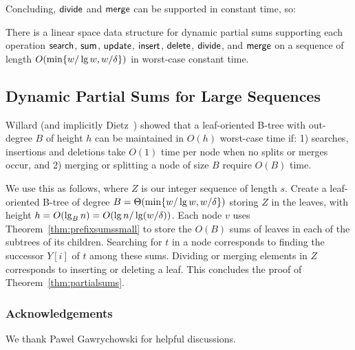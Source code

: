 


%

Concluding, $\mathsf{divide}$ and $\mathsf{merge}$ can be supported in constant time, so:

\begin{theorem}\label{thm:prefixsumssmall}
    There is a linear space data structure for dynamic partial sums supporting each operation $\mathsf{search}$, $\mathsf{sum}$, $\mathsf{update}$, $\mathsf{insert}$, $\mathsf{delete}$, $\mathsf{divide}$, and $\mathsf{merge}$ on a sequence of length $O(\min \{w / \lg w, w / \delta \})$ in worst-case constant time.
\end{theorem}

\subsection{Dynamic Partial Sums for Large Sequences}
Willard \cite{willard2000examining} (and implicitly Dietz~\cite{dietz1989optimal}) showed that a leaf-oriented B-tree with out-degree $B$ of height $h$ can be maintained in $O(h)$ worst-case time if: 1) searches, insertions and deletions take $O(1)$ time per node when no splits or merges occur, and 2) merging or splitting a node of size $B$ require $O(B)$ time.

We use this as follows, where $Z$ is our integer sequence of length $s$. Create a leaf-oriented B-tree of degree $B = \Theta(\min \{w / \lg w, w / \delta \})$ storing $Z$ in the leaves, with height $h = O(\lg_B n) = O(\lg n / \lg (w / \delta))$.
Each node $v$%
uses Theorem~\ref{thm:prefixsumssmall} to store the $O(B)$ sums of leaves in each of the subtrees of its children. Searching for $t$ in a node corresponds to finding the successor $Y[i]$ of $t$ among these sums. Dividing or merging elements in $Z$ corresponds to inserting or deleting a leaf. This concludes the proof of Theorem~\ref{thm:partialsums}.





\subsubsection*{Acknowledgements}
We thank Pawel Gawrychowski for helpful discussions.


